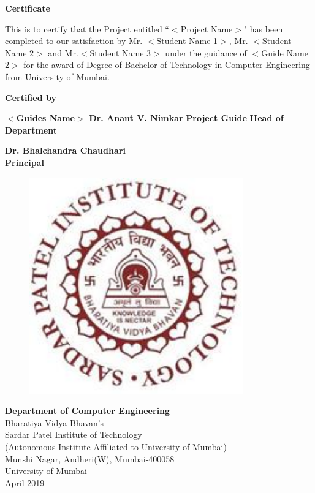 \thispagestyle{empty}
\vspace*{0.2cm}
\vspace{1cm}
\begin{center}
\large\textbf{Certificate}
\end{center}
\vspace{1cm}
This is to certify that the Project entitled ``$<$Project Name$>$" has been completed to our
satisfaction by Mr. $<$Student Name 1$>$, Mr. $<$Student Name 2$>$ and Mr.$<$Student Name 3$>$  under the guidance of $<$Guide Name 2$>$ for the award of Degree of Bachelor of Technology in Computer Engineering from University of Mumbai.\\
\vspace{1cm}
\begin{center}
\textbf{Certified by}
\end{center}
\vspace{1cm}


\textbf {$<$Guides Name$>$}
\hspace{2.0in}\textbf  {Dr. Anant V. Nimkar}
\newline
\hspace*{0.5cm}
\textbf {Project Guide} \hspace{2.4in} \textbf{Head of Department} \\
\vspace{1cm}
 

\begin{center}
\textbf{Dr. Bhalchandra Chaudhari}\\
\textbf{Principal}
\end{center}
 
\begin{figure}[h]
\centering
\includegraphics[scale=0.8]{spitlogo.pdf}

\end{figure}
\hspace{.05cm}
\hspace{.05cm}
 
\begin{center}
\textbf {Department of Computer Engineering}\\
Bharatiya  Vidya Bhavan's\\
Sardar Patel Institute of Technology\\
(Autonomous Institute Affiliated to University of Mumbai)\\
Munshi Nagar, Andheri(W), Mumbai-400058\\
University of Mumbai\\
April 2019\\
\end{center}

